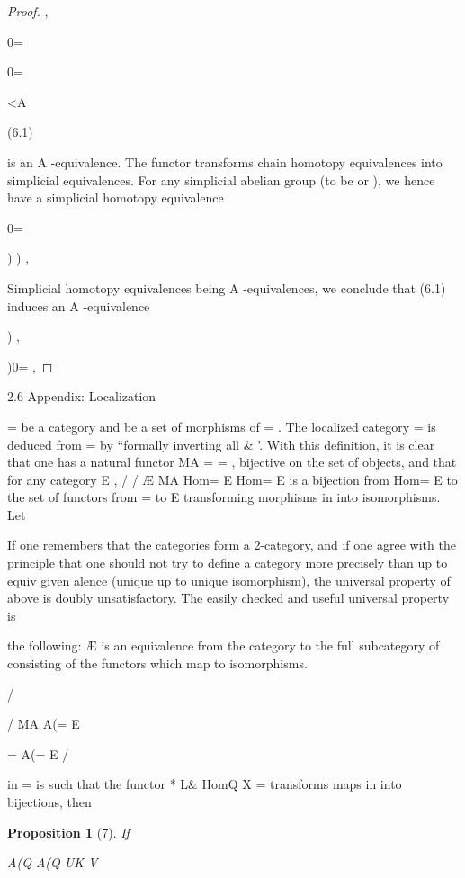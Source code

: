 \documentclass[11pt,a4paper]{article}
\theoremstyle{plain}
\newtheorem{proposition}[theorem]{Proposition}
\theoremstyle{definition}
\begin{document}
\begin{proof}
, 





0=  



0= 

<A

(6.1)



is an A -equivalence. The functor transforms chain homotopy equivalences into
simplicial equivalences. For any simplicial abelian group  (to be  or
  ),
we hence have a simplicial homotopy equivalence

0=





)    ) ,

Simplicial homotopy equivalences being A -equivalences, we conclude that (6.1)
induces an A -equivalence

) ,

)0= ,


\end{proof}

2.6 Appendix: Localization

= be a category and  be a set of morphisms of = . The localized category
=   is deduced from = by ``formally inverting all \&   '. With this definition,
it is clear that one has a natural functor MA =
= , bijective on the set of
objects, and that for any category E ,
/  / Æ MA Hom=  E Hom= E
is a bijection from Hom=   E to the set of functors from = to E transforming
morphisms in  into isomorphisms.
Let

If one remembers that the categories form a 2-category, and if one agree with the
principle that one should not try to define a category more precisely than up to equiv given
alence (unique up to unique isomorphism), the universal property of
above is doubly unsatisfactory. The easily checked and useful universal property is

the following: 
Æ is an equivalence from the category
to the full subcategory of
consisting of the functors which map to
isomorphisms.

/

/ MA
A(= E

= 
A(=  E
/


 in = is such that the functor
*
L\&   HomQ   
X =
transforms maps in  into bijections, then

\begin{proposition}[7]
If

A(Q     A(Q UK V  

\end{proposition}
\end{document}
